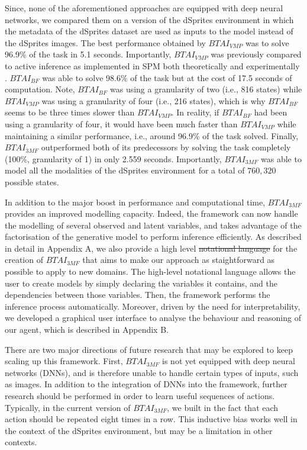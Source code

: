 \documentclass[twoside,11pt]{article}
\providecommand{\DIFadd}[1]{{\protect\color{blue}\uwave{#1}}} %
\providecommand{\DIFdel}[1]{{\protect\color{red}\sout{#1}}}                      %
\providecommand{\DIFaddbegin}{} %
\providecommand{\DIFaddend}{} %
\providecommand{\DIFdelbegin}{} %
\providecommand{\DIFdelend}{} %
\begin{document}
Since, none of the aforementioned approaches are equipped with deep neural networks, we compared them on a version of the dSprites environment in which the metadata of the dSprites dataset are used as inputs to the model instead of the dSprites images. The best performance obtained by $BTAI_{VMP}$ was to solve 96.9\% of the task in 5.1 seconds. Importantly, $BTAI_{VMP}$  was previously compared to active inference as implemented in SPM both theoretically and experimentally \citep{AITS_THEORY, AITS_PRACTICE}. $BTAI_{BF}$ was able to solve 98.6\% of the task but at the cost of 17.5 seconds of computation. Note, $BTAI_{BF}$ was using a granularity of two (i.e., 816 states) while $BTAI_{VMP}$ was using a granularity of four (i.e., 216 states), which is why $BTAI_{BF}$ seems to be three times slower than $BTAI_{VMP}$. In reality, if $BTAI_{BF}$ had been using a granularity of four, it would have been much faster than $BTAI_{VMP}$ while maintaining a similar performance, i.e., around 96.9\% of the task solved. Finally, $BTAI_{3MF}$ outperformed both of its predecessors by solving the task completely (100\%, granularity of 1) in only 2.559 seconds. Importantly, $BTAI_{3MF}$ was able to model all the modalities of the dSprites environment for a total of $760,320$ possible states.

In addition to the major boost in performance and computational time, $BTAI_{3MF}$ provides an improved modelling capacity. Indeed, the framework can now handle the modelling of several observed and latent variables, and takes advantage of the factorisation of the generative model to perform inference efficiently. As described in detail in Appendix A, we also provide a high level \DIFdelbegin \DIFdel{notational language }\DIFdelend \DIFaddbegin \DIFadd{notation }\DIFaddend for the creation of $BTAI_{3MF}$ that aims to make our approach as staightforward as possible to apply to new domains. The high-level notational language allows the user to create models by simply declaring the variables it contains, and the dependencies between those variables. Then, the framework performs the inference process automatically. Moreover, driven by the need for interpretability, we developed a graphical user interface to analyse the behaviour and reasoning of our agent, which is described in Appendix B.

There are two major directions of future research that may be explored to keep scaling up this framework. First, $BTAI_{3MF}$ is not yet equipped with deep neural networks (DNNs), and is therefore unable to handle certain types of inputs, such as images. In addition to the integration of DNNs into the framework, further research should be performed in order to learn useful sequences of actions. Typically, in the current version of $BTAI_{3MF}$, we built in the fact that each action should be repeated eight times in a row. This inductive bias works well in the context of the dSprites environment, but may be a limitation in other contexts.
\end{document}
